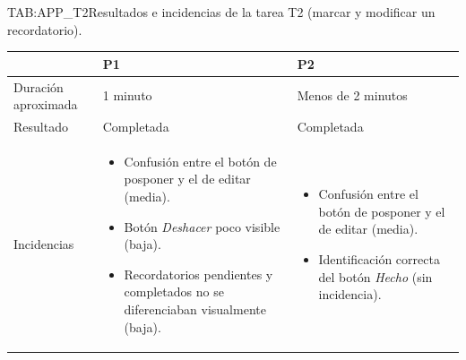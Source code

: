 \begin{table}[Incidencias T2]{TAB:APP_T2}{Resultados e
incidencias de la tarea T2 (marcar y modificar un recordatorio).}
\begin{center}
\begin{tabular}{p{3.5cm}p{4.5cm}p{4.5cm}}
\toprule
& \textbf{P1} & \textbf{P2} \\
\midrule
Duración aproximada    & 1 minuto       & Menos de 2 minutos \\
Resultado              & Completada     & Completada \\
\midrule
Incidencias &
\begin{itemize}\setlength\itemsep{0pt}\setlength\parsep{0pt}
\item Confusión entre el botón de posponer y el de editar (media).
\item Botón \emph{Deshacer} poco visible (baja).
\item Recordatorios pendientes y completados no se diferenciaban visualmente (baja).
\end{itemize}
&
\begin{itemize}\setlength\itemsep{0pt}\setlength\parsep{0pt}
\item Confusión entre el botón de posponer y el de editar (media).
\item Identificación correcta del botón \emph{Hecho} (sin incidencia).
\end{itemize}\\
\bottomrule
\end{tabular}
\end{center}
\end{table}
\FloatBarrier

